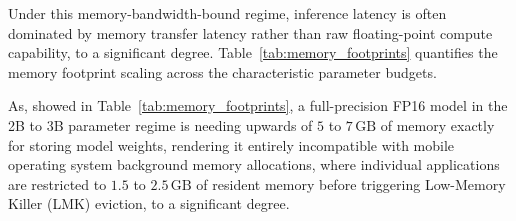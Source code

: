 \documentclass[12pt,a4paper,oneside]{report}
\begin{document}
    Under this memory-bandwidth-bound regime, inference latency is often dominated by memory transfer latency rather than raw floating-point compute capability, to a significant degree. Table~\ref{tab:memory_footprints} quantifies the memory footprint scaling across the characteristic parameter budgets.

    \begin{table}[h!]
    \centering
    \caption{Memory Footprint Across Model Scales and Precision Formats}
    \label{tab:memory_footprints}
    \renewcommand{\arraystretch}{1.2}
    \end{table}

    As, showed in Table~\ref{tab:memory_footprints}, a full-precision FP16 model in the 2B to 3B parameter regime is needing upwards of $5$ to $7\,\text{GB}$ of memory exactly for storing model weights, rendering it entirely incompatible with mobile operating system background memory allocations, where individual applications are restricted to $1.5$ to $2.5\,\text{GB}$ of resident memory before triggering Low-Memory Killer (LMK) eviction, to a significant degree.
\end{document}
